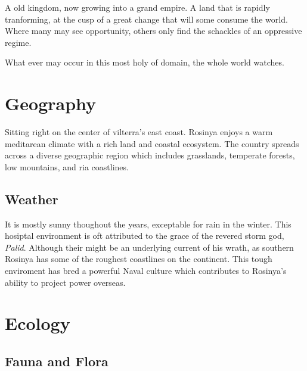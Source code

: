 \documentclass[../main.tex]{subfiles}
\begin{document}

 A old kingdom, now growing into a grand empire. A land that is rapidly tranforming, 
at the cusp of a great change that will some consume the world. 
Where many may see opportunity, others only find the schackles of an oppressive regime.

What ever may occur in this most holy of domain, the whole world watches. 



\section{Geography} 
Sitting right on the center of vilterra's east coast. Rosinya enjoys a warm meditarean climate
with a rich land and coastal ecosystem. The country spreads across a diverse geographic
region which includes grasslands, temperate forests, low mountains, and ria coastlines.

\subsection{Weather} 
It is mostly sunny thoughout the years, exceptable for rain in the winter. 
This hosiptal environment is oft attributed to the grace of the revered 
storm god, \emph{Palid}. Although their might be an underlying current of his wrath,
as southern Rosinya has some of the roughest coastlines on the continent.
This tough enviroment has bred a powerful Naval culture which contributes 
to Rosinya's ability to project power overseas. 



\section{Ecology}

\subsection{Fauna and Flora}
\end{document}
